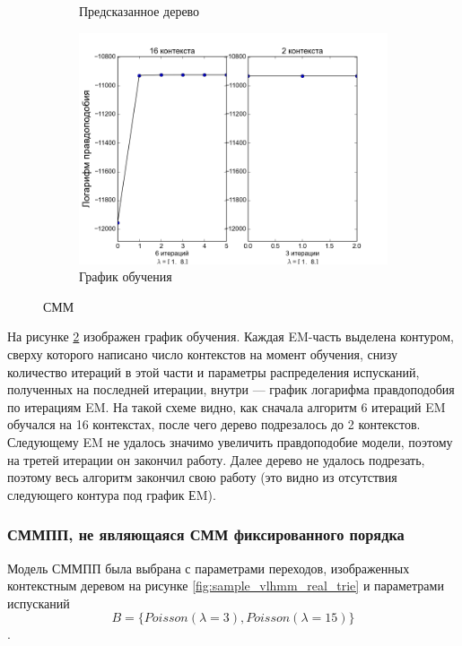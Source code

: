 \documentclass{matmex-diploma-custom}
\begin{document}
\begin{figure}[h!]
\begin{subfigure}[b]{0.49 \textwidth}
	\centering
	\caption{ Предсказанное дерево }
	\label{fig:sample_hmm1_predicted_trie}
\end{subfigure}
\begin{subfigure}[b]{0.8 \textwidth}
	\includegraphics[scale=0.38]{img/sample_hmm1/plot_.png}
	\centering
	\caption{ График обучения }
	\label{fig:sample_hmm1_log_likelihood}
\end{subfigure}
\caption{ СММ }
\label{fig:sample_hmm1}
\end{figure}

На рисунке \ref{fig:sample_hmm1_log_likelihood} изображен график обучения. Каждая EM-часть выделена контуром, сверху которого написано число контекстов на момент обучения, снизу количество итераций в этой части и параметры распределения испусканий, полученных на последней итерации, внутри --- график логарифма правдоподобия по итерациям EM. 
На такой схеме видно, как сначала алгоритм 6 итераций EM обучался на 16 контекстах, после чего дерево подрезалось до 2 контекстов. Следующему EM не удалось значимо увеличить правдоподобие модели, поэтому на третей итерации он закончил работу. Далее дерево не удалось подрезать, поэтому весь алгоритм закончил свою работу (это видно из отсутствия следующего контура под график ЕM).

\subsubsection{СММПП, не являющаяся СММ фиксированного порядка}
Модель СММПП была выбрана с параметрами переходов, изображенных контекстным деревом на рисунке \ref{fig:sample_vlhmm_real_trie} и параметрами испусканий
$$B = \{\textit{Poisson}(\lambda=3), \textit{Poisson}(\lambda=15)\}$$.
\end{document}
